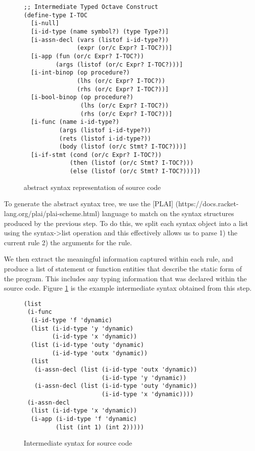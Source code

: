 \begin{figure}[h]
    \begin{lstlisting}[language=racket]
;; Intermediate Typed Octave Construct
(define-type I-TOC
  [i-null]
  [i-id-type (name symbol?) (type Type?)]
  [i-assn-decl (vars (listof i-id-type?))
               (expr (or/c Expr? I-TOC?))]
  [i-app (fun (or/c Expr? I-TOC?))
         (args (listof (or/c Expr? I-TOC?)))]
  [i-int-binop (op procedure?)
               (lhs (or/c Expr? I-TOC?))
               (rhs (or/c Expr? I-TOC?))]
  [i-bool-binop (op procedure?)
                (lhs (or/c Expr? I-TOC?))
                (rhs (or/c Expr? I-TOC?))]
  [i-func (name i-id-type?)
          (args (listof i-id-type?))
          (rets (listof i-id-type?))
          (body (listof (or/c Stmt? I-TOC?)))]
  [i-if-stmt (cond (or/c Expr? I-TOC?))
             (then (listof (or/c Stmt? I-TOC?)))
             (else (listof (or/c Stmt? I-TOC?)))])
    \end{lstlisting}
    \caption[]{abstract syntax representation of source code}
\end{figure}

To generate the abstract syntax tree, we use the [PLAI] (https://docs.racket-lang.org/plai/plai-scheme.html) language to match on the syntax structures produced by the previous step. To do this, we split each syntax object into a list using the syntax->list operation and this effectively allows us to parse 1) the current rule 2) the arguments for the rule.

We then extract the meaningful information captured within each rule, and produce a list of statement or function entities that describe the static form of the program. This includes any typing information that was declared within the source code. Figure \ref{fig:intermediate} is the example intermediate syntax obtained from this step.

\begin{figure}[h]
    \begin{lstlisting}[language=racket]
(list
 (i-func
  (i-id-type 'f 'dynamic)
  (list (i-id-type 'y 'dynamic)
        (i-id-type 'x 'dynamic))
  (list (i-id-type 'outy 'dynamic)
        (i-id-type 'outx 'dynamic))
  (list
   (i-assn-decl (list (i-id-type 'outx 'dynamic))
                      (i-id-type 'y 'dynamic))
   (i-assn-decl (list (i-id-type 'outy 'dynamic))
                      (i-id-type 'x 'dynamic))))
 (i-assn-decl
  (list (i-id-type 'x 'dynamic))
  (i-app (i-id-type 'f 'dynamic)
         (list (int 1) (int 2)))))
    \end{lstlisting}
    \caption[]{Intermediate syntax for source code}
    \label{fig:intermediate}
\end{figure}

